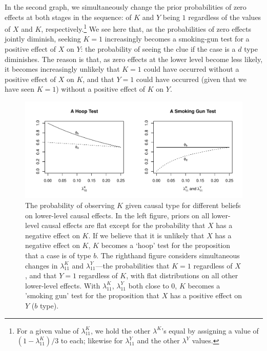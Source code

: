 \documentclass[
  12pt,
]{book}
\begin{document}
In the second graph, we simultaneously change the prior probabilities of zero effects at both stages in the sequence: of \(K\) and \(Y\) being \(1\) regardless of the values of \(X\) and \(K\), respectively.\footnote{For a given value of \(\lambda^K_{11}\), we hold the other \(\lambda^K\)'s equal by assigning a value of \((1-\lambda^K_{11})/3\) to each; likewise for \(\lambda^Y_{11}\) and the other \(\lambda^Y\) values.} We see here that, as the probabilities of zero effects jointly diminish, seeking \(K=1\) increasingly becomes a smoking-gun test for a positive effect of \(X\) on \(Y\): the probability of seeing the clue if the case is a \(d\) type diminishes. The reason is that, as zero effects at the lower level become less likely, it becomes increasingly unlikely that \(K=1\) could have occurred without a positive effect of \(X\) on \(K\), and that \(Y=1\) could have occurred (given that we have seen \(K=1\)) without a positive effect of \(K\) on \(Y\).

\begin{figure}

{\centering \includegraphics[width=.85\textwidth]{ii_files/figure-latex/phis-1} 

}

\caption{The probability of observing $K$ given causal type for different beliefs on lower-level causal effects. In the left figure, priors on all lower-level causal effects are flat except for the probability that $X$ has a negative effect on $K$. If we believe that it is unlikely that $X$ has a negative effect on $K$, $K$ becomes a `hoop' test for the proposition that a case is of type $b$. The righthand figure considers simultaneous changes in $\lambda_{11}^K$ and  $\lambda_{11}^Y$---the probabilities that $K=1$ regardless of $X$, and that $Y=1$  regardless of $K$, with flat distributions on all other lower-level effects. With $\lambda_{11}^K$, $\lambda_{11}^Y$ both close to 0, $K$ becomes a 'smoking gun' test for the proposition that $X$ has a positive effect on $Y$ ($b$ type).}\label{fig:phis}
\end{figure}
\end{document}
